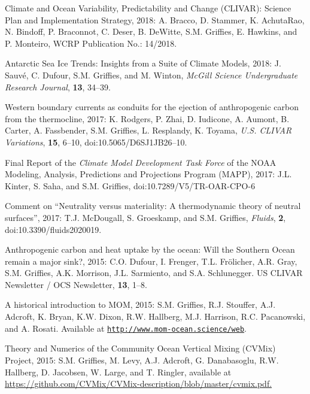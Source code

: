 \begin{etaremune}

\item Climate and Ocean Variability, Predictability and Change (CLIVAR): Science Plan and Implementation Strategy, 2018: 
A. Bracco, D. Stammer, K. AchutaRao, N. Bindoff, 
P. Braconnot, C. Deser, B. DeWitte, S.M. Grif\/f\/ies, E. Hawkins, and P. Monteiro, WCRP Publication No.: 14/2018. 

\item Antarctic Sea Ice Trends: Insights from a Suite of Climate Models, 2018: J. Sauv\'{e}, C. Dufour, S.M. Grif\/f\/ies, and M. Winton, {\it McGill Science Undergraduate Research Journal}, {\bf 13}, 34--39. 

\item Western boundary currents as conduits for the ejection of anthropogenic carbon from the thermocline, 2017: K. Rodgers, P. Zhai, D. Iudicone, A. Aumont, B. Carter, A. Fassbender, S.M. Grif\/f\/ies, L. Resplandy, K. Toyama, {\it U.S. CLIVAR Variations}, {\bf 15}, 6--10, doi:10.5065/D6SJ1JB26--10.

\item Final Report of the {\it Climate Model Development Task Force} of the NOAA Modeling, Analysis, Predictions and Projections Program (MAPP), 2017: J.L. Kinter, S. Saha, and S.M. Grif\/fies, doi:10.7289/V5/TR-OAR-CPO-6

\item Comment on ``Neutrality versus materiality: A thermodynamic theory of neutral surfaces'', 2017: T.J. McDougall, S. Groeskamp, and S.M. Grif\/fies, {\it Fluids}, {\bf 2},  doi:10.3390/fluids2020019.

\item Anthropogenic carbon and heat uptake by the ocean: Will the Southern Ocean remain a major sink?, 2015: C.O. Dufour, I. Frenger, T.L. Fr\"{o}licher, A.R. Gray, S.M. Grif\/f\/ies, A.K. Morrison, J.L. Sarmiento, and S.A. Schlunegger.  US CLIVAR Newsletter / OCS Newsletter, {\bf 13}, 1--8.

\item A historical introduction to MOM, 2015: S.M. Grif\/f\/ies, R.J. Stouffer, A.J. Adcroft, K. Bryan, K.W. Dixon, R.W. Hallberg, M.J. Harrison, R.C. Pacanowski, and A. Rosati.  Available at \href{\tt  http://www.mom-ocean.science/web/docs/project/mom_history_v15.09.05.pdf}{\tt http://www.mom-ocean.science/web}.
  
  
\item Theory and Numerics of the Community Ocean Vertical Mixing (CVMix) Project, 2015: S.M. Grif\/f\/ies, M. Levy, A.J. Adcroft, G. Danabasoglu, R.W. Hallberg, D. Jacobsen, W. Large, and T. Ringler, available at \href{https://github.com/CVMix/CVMix-description/blob/master/cvmix.pdf}{https://github.com/CVMix/CVMix-description/blob/master/cvmix.pdf.}


\end{etaremune}
